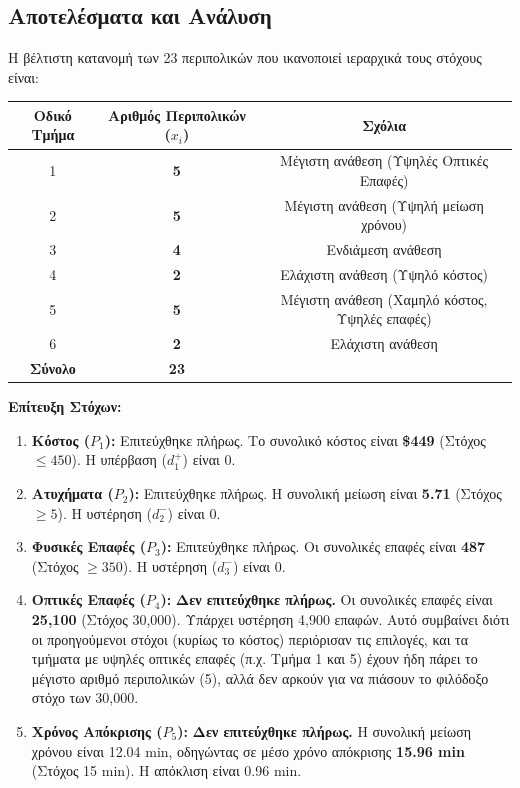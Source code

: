 \documentclass[12pt, a4paper]{article}
\begin{document}
\subsection*{Αποτελέσματα και Ανάλυση}

Η βέλτιστη κατανομή των 23 περιπολικών που ικανοποιεί ιεραρχικά τους στόχους είναι:

\begin{table}[h]
\centering
\begin{tabular}{|c|c|c|}
\hline
\textbf{Οδικό Τμήμα} & \textbf{Αριθμός Περιπολικών ($x_i$)} & \textbf{Σχόλια} \\ \hline
1 & \textbf{5} & Μέγιστη ανάθεση (Υψηλές Οπτικές Επαφές) \\ \hline
2 & \textbf{5} & Μέγιστη ανάθεση (Υψηλή μείωση χρόνου) \\ \hline
3 & \textbf{4} & Ενδιάμεση ανάθεση \\ \hline
4 & \textbf{2} & Ελάχιστη ανάθεση (Υψηλό κόστος) \\ \hline
5 & \textbf{5} & Μέγιστη ανάθεση (Χαμηλό κόστος, Υψηλές επαφές) \\ \hline
6 & \textbf{2} & Ελάχιστη ανάθεση \\ \hline
\textbf{Σύνολο} & \textbf{23} & \\ \hline
\end{tabular}
\end{table}

\textbf{Επίτευξη Στόχων:}

\begin{enumerate}
    \item \textbf{Κόστος ($P_1$):} Επιτεύχθηκε πλήρως. Το συνολικό κόστος είναι \textbf{\$449} (Στόχος $\le 450$). Η υπέρβαση ($d_1^+$) είναι 0.
    \item \textbf{Ατυχήματα ($P_2$):} Επιτεύχθηκε πλήρως. Η συνολική μείωση είναι \textbf{5.71} (Στόχος $\ge 5$). Η υστέρηση ($d_2^-$) είναι 0.
    \item \textbf{Φυσικές Επαφές ($P_3$):} Επιτεύχθηκε πλήρως. Οι συνολικές επαφές είναι \textbf{487} (Στόχος $\ge 350$). Η υστέρηση ($d_3^-$) είναι 0.
    \item \textbf{Οπτικές Επαφές ($P_4$):} \textbf{Δεν επιτεύχθηκε πλήρως.} Οι συνολικές επαφές είναι \textbf{25,100} (Στόχος 30,000). Υπάρχει υστέρηση 4,900 επαφών. Αυτό συμβαίνει διότι οι προηγούμενοι στόχοι (κυρίως το κόστος) περιόρισαν τις επιλογές, και τα τμήματα με υψηλές οπτικές επαφές (π.χ. Τμήμα 1 και 5) έχουν ήδη πάρει το μέγιστο αριθμό περιπολικών (5), αλλά δεν αρκούν για να πιάσουν το φιλόδοξο στόχο των 30,000.
    \item \textbf{Χρόνος Απόκρισης ($P_5$):} \textbf{Δεν επιτεύχθηκε πλήρως.} Η συνολική μείωση χρόνου είναι 12.04 min, οδηγώντας σε μέσο χρόνο απόκρισης \textbf{15.96 min} (Στόχος 15 min). Η απόκλιση είναι 0.96 min.
\end{enumerate}
\end{document}

